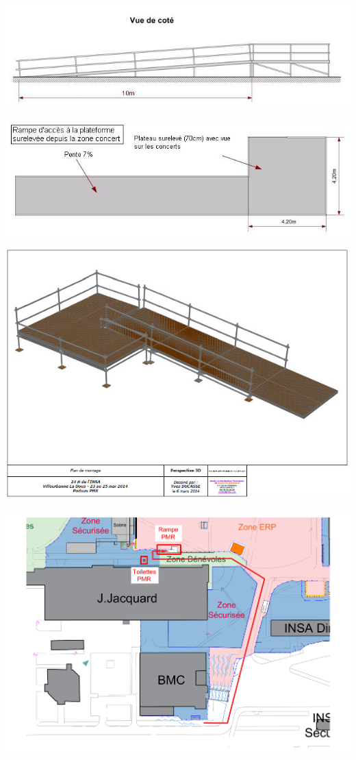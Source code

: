\documentclass[hidelinks, paper=a4, fontsize=13pt]{report}
\begin{document}
\begin{center}
\includegraphics[scale=0.8]{Annexes/Images/structurePMRCote}
\end{center}
\begin{center}
\includegraphics[scale=0.8]{Annexes/Images/structurePMRDessus}
\end{center}
\begin{center}
\includegraphics[scale=0.6]{Annexes/Images/structurePMR3D}
\end{center}
\begin{center}
\includegraphics[width=.8\textwidth,keepaspectratio]{Exports/Plan_24h_44eme-Acces_PMR_Rampe}
\end{center}
\end{document}
